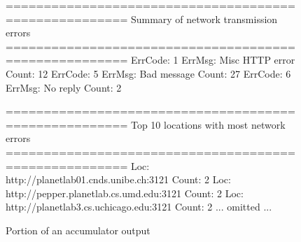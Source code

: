  



\begin{figure}[th]
\centering
\begin{scodebox}
======================================================
Summary of network transmission errors
======================================================
ErrCode: 1      ErrMsg: Misc HTTP error Count: 12
ErrCode: 5      ErrMsg: Bad message     Count: 27
ErrCode: 6      ErrMsg: No reply        Count: 2

======================================================
Top 10 locations with most network errors
======================================================
Loc: http://planetlab01.cnds.unibe.ch:3121    Count: 2
Loc: http://pepper.planetlab.cs.umd.edu:3121  Count: 2
Loc: http://planetlab3.cs.uchicago.edu:3121   Count: 2
... omitted ...
\end{scodebox}
\caption{Portion of an accumulator output} \label{fig:acc}
\end{figure} 




